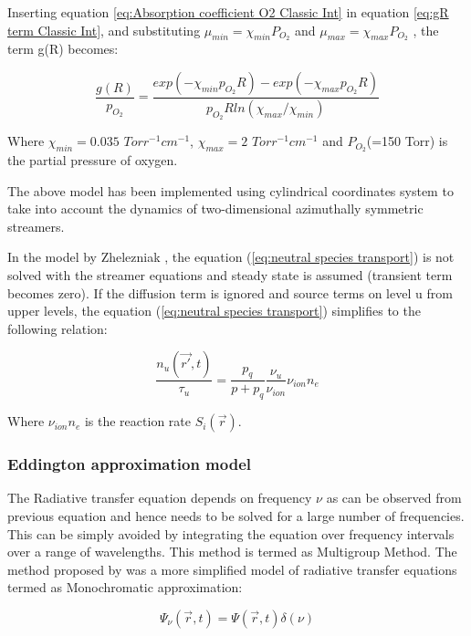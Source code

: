 \documentclass[paper=a4, fontsize=13pt]{scrartcl}
\begin{document}
Inserting equation \ref{eq:Absorption coefficient O2 Classic Int} in equation \ref{eq:gR term Classic Int}, and substituting $\mu_{min}=\chi_{min} P_{O_2}$ and $\mu_{max}=\chi_{max} P_{O_2}$ , the term g(R) becomes:

\begin{equation}
\frac{g(R)}{p_{O_2}} = \frac{exp(-\chi_{min} p_{O_2} R)- exp(-\chi_{max} p_{O_2} R)}{p_{O_2} R ln(\chi_{max} / \chi_{min})}
\end{equation} 

Where $\chi_{min}= 0.035$ $Torr^{-1} cm^{-1}$, $\chi_{max}= 2$ $Torr^{-1} cm^{-1}$ and $P_{O_2}$(=150 Torr) is the partial pressure of oxygen.

The above model has been implemented using cylindrical coordinates system to take into account the dynamics of two-dimensional azimuthally symmetric streamers.

In the model by Zhelezniak \cite{ZhelezniakM.B.andMnatsakanianA.K.andSizykh1982PhotoionizationDischarge}, the equation (\ref{eq:neutral species transport}) is not solved with the streamer equations and steady state is assumed (transient term becomes zero). If the diffusion term is ignored and source terms on level u from upper levels, the equation (\ref{eq:neutral species transport}) simplifies to the following relation:

\begin{equation}
\frac{n_u(\vec{r'},t)}{\tau_u} = \frac{p_q}{p+p_q} \frac{\nu_u}{\nu_{ion}} \nu_{ion} n_e
\end{equation} 

Where $\nu_{ion} n_e$ is the reaction rate $S_i(\vec{r})$.


\subsubsection{Eddington approximation model}
The Radiative transfer equation depends on frequency $\nu$ as can be observed from previous equation and hence needs to be solved for a large number of frequencies. This can be simply avoided by integrating the equation over frequency intervals over a range of wavelengths. This method is termed as Multigroup Method. The method proposed by \cite{Segur2006} was a more simplified model of radiative transfer equations termed as Monochromatic approximation:

\begin{equation}
\Psi_\nu(\vec{r},t) = \Psi(\vec{r},t) \delta(\nu)
\end{equation} 
\end{document}
